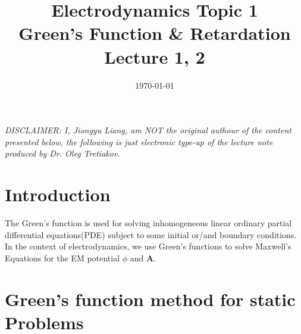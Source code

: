 \documentclass[12pt,english]{article}
\title{\textbf{Electrodynamics Topic 1}\\ 
\large Green's Function \& Retardation\\ 
\small Lecture 1, 2}
\date{\today}
\renewcommand{\vec}[1]{\boldsymbol{#1}}
\begin{document}
\begin{titlepage}
    \maketitle
    \vfill
    \emph{DISCLAIMER: I, Jiongyu Liang, am NOT the original authour of the content presented %
        below, the following is just electronic type-up of the lecture note produced %
        by Dr. Oleg Tretiakov.}
\end{titlepage}
\cleardoublepage
{}
\newpage
\tableofcontents
\newpage

\newpage
\section{Introduction}
The Green's function is used for solving inhomogeneous linear ordinary partial differential equations(PDE) subject to some initial or/and boundary conditions. In the context of electrodynamics, we use Green's functions to solve Maxwell's Equations for the EM potential $\phi$ and $\vec{A}$.



\section{Green's function method for static Problems}
\end{document}

